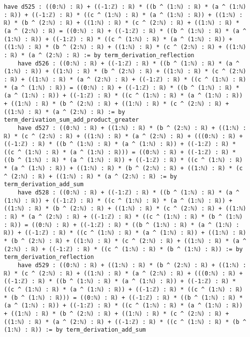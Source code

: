 \documentclass{article}
\begin{document}
\begin{tcolorbox}[colback=white!10, width=\linewidth]
\begin{lstlisting}[language=Lean4]
    have d525 : ((0:ℕ) : ℝ) + ((-1:ℤ) : ℝ) * ((b ^ (1:ℕ) : ℝ) * (a ^ (1:ℕ) : ℝ)) + ((-1:ℤ) : ℝ) * ((c ^ (1:ℕ) : ℝ) * (a ^ (1:ℕ) : ℝ)) + ((1:ℕ) : ℝ) * (b ^ (2:ℕ) : ℝ) + ((1:ℕ) : ℝ) * (c ^ (2:ℕ) : ℝ) + ((1:ℕ) : ℝ) * (a ^ (2:ℕ) : ℝ) = ((0:ℕ) : ℝ) + ((-1:ℤ) : ℝ) * ((b ^ (1:ℕ) : ℝ) * (a ^ (1:ℕ) : ℝ)) + ((-1:ℤ) : ℝ) * ((c ^ (1:ℕ) : ℝ) * (a ^ (1:ℕ) : ℝ)) + ((1:ℕ) : ℝ) * (b ^ (2:ℕ) : ℝ) + ((1:ℕ) : ℝ) * (c ^ (2:ℕ) : ℝ) + ((1:ℕ) : ℝ) * (a ^ (2:ℕ) : ℝ) := by term_derivation_reflection
    have d526 : ((0:ℕ) : ℝ) + ((-1:ℤ) : ℝ) * ((b ^ (1:ℕ) : ℝ) * (a ^ (1:ℕ) : ℝ)) + ((1:ℕ) : ℝ) * (b ^ (2:ℕ) : ℝ) + ((1:ℕ) : ℝ) * (c ^ (2:ℕ) : ℝ) + ((1:ℕ) : ℝ) * (a ^ (2:ℕ) : ℝ) + ((-1:ℤ) : ℝ) * ((c ^ (1:ℕ) : ℝ) * (a ^ (1:ℕ) : ℝ)) = ((0:ℕ) : ℝ) + ((-1:ℤ) : ℝ) * ((b ^ (1:ℕ) : ℝ) * (a ^ (1:ℕ) : ℝ)) + ((-1:ℤ) : ℝ) * ((c ^ (1:ℕ) : ℝ) * (a ^ (1:ℕ) : ℝ)) + ((1:ℕ) : ℝ) * (b ^ (2:ℕ) : ℝ) + ((1:ℕ) : ℝ) * (c ^ (2:ℕ) : ℝ) + ((1:ℕ) : ℝ) * (a ^ (2:ℕ) : ℝ) := by term_derivation_sum_add_product_greater
    have d527 : ((0:ℕ) : ℝ) + ((1:ℕ) : ℝ) * (b ^ (2:ℕ) : ℝ) + ((1:ℕ) : ℝ) * (c ^ (2:ℕ) : ℝ) + ((1:ℕ) : ℝ) * (a ^ (2:ℕ) : ℝ) + (((0:ℕ) : ℝ) + ((-1:ℤ) : ℝ) * ((b ^ (1:ℕ) : ℝ) * (a ^ (1:ℕ) : ℝ)) + ((-1:ℤ) : ℝ) * ((c ^ (1:ℕ) : ℝ) * (a ^ (1:ℕ) : ℝ))) = ((0:ℕ) : ℝ) + ((-1:ℤ) : ℝ) * ((b ^ (1:ℕ) : ℝ) * (a ^ (1:ℕ) : ℝ)) + ((-1:ℤ) : ℝ) * ((c ^ (1:ℕ) : ℝ) * (a ^ (1:ℕ) : ℝ)) + ((1:ℕ) : ℝ) * (b ^ (2:ℕ) : ℝ) + ((1:ℕ) : ℝ) * (c ^ (2:ℕ) : ℝ) + ((1:ℕ) : ℝ) * (a ^ (2:ℕ) : ℝ) := by term_derivation_add_sum
    have d528 : ((0:ℕ) : ℝ) + ((-1:ℤ) : ℝ) * ((b ^ (1:ℕ) : ℝ) * (a ^ (1:ℕ) : ℝ)) + ((-1:ℤ) : ℝ) * ((c ^ (1:ℕ) : ℝ) * (a ^ (1:ℕ) : ℝ)) + ((1:ℕ) : ℝ) * (b ^ (2:ℕ) : ℝ) + ((1:ℕ) : ℝ) * (c ^ (2:ℕ) : ℝ) + ((1:ℕ) : ℝ) * (a ^ (2:ℕ) : ℝ) + ((-1:ℤ) : ℝ) * ((c ^ (1:ℕ) : ℝ) * (b ^ (1:ℕ) : ℝ)) = ((0:ℕ) : ℝ) + ((-1:ℤ) : ℝ) * ((b ^ (1:ℕ) : ℝ) * (a ^ (1:ℕ) : ℝ)) + ((-1:ℤ) : ℝ) * ((c ^ (1:ℕ) : ℝ) * (a ^ (1:ℕ) : ℝ)) + ((1:ℕ) : ℝ) * (b ^ (2:ℕ) : ℝ) + ((1:ℕ) : ℝ) * (c ^ (2:ℕ) : ℝ) + ((1:ℕ) : ℝ) * (a ^ (2:ℕ) : ℝ) + ((-1:ℤ) : ℝ) * ((c ^ (1:ℕ) : ℝ) * (b ^ (1:ℕ) : ℝ)) := by term_derivation_reflection
    have d529 : ((0:ℕ) : ℝ) + ((1:ℕ) : ℝ) * (b ^ (2:ℕ) : ℝ) + ((1:ℕ) : ℝ) * (c ^ (2:ℕ) : ℝ) + ((1:ℕ) : ℝ) * (a ^ (2:ℕ) : ℝ) + (((0:ℕ) : ℝ) + ((-1:ℤ) : ℝ) * ((b ^ (1:ℕ) : ℝ) * (a ^ (1:ℕ) : ℝ)) + ((-1:ℤ) : ℝ) * ((c ^ (1:ℕ) : ℝ) * (a ^ (1:ℕ) : ℝ)) + ((-1:ℤ) : ℝ) * ((c ^ (1:ℕ) : ℝ) * (b ^ (1:ℕ) : ℝ))) = ((0:ℕ) : ℝ) + ((-1:ℤ) : ℝ) * ((b ^ (1:ℕ) : ℝ) * (a ^ (1:ℕ) : ℝ)) + ((-1:ℤ) : ℝ) * ((c ^ (1:ℕ) : ℝ) * (a ^ (1:ℕ) : ℝ)) + ((1:ℕ) : ℝ) * (b ^ (2:ℕ) : ℝ) + ((1:ℕ) : ℝ) * (c ^ (2:ℕ) : ℝ) + ((1:ℕ) : ℝ) * (a ^ (2:ℕ) : ℝ) + ((-1:ℤ) : ℝ) * ((c ^ (1:ℕ) : ℝ) * (b ^ (1:ℕ) : ℝ)) := by term_derivation_add_sum

\end{lstlisting}
\end{tcolorbox}
\end{document}
